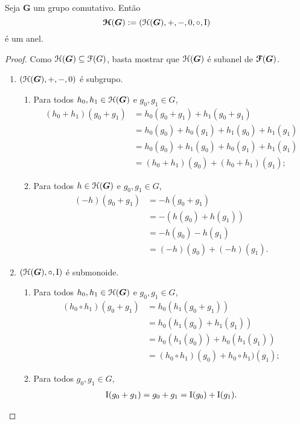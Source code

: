 \begin{proposition}
Seja $\bm G$ um grupo comutativo. Então
	\begin{equation*}
	\bm{\mathcal{H}}(\bm G) := (\mathcal{H}(\bm G),+,-,0,\circ,\mathrm{I})
	\end{equation*}
é um anel.
\end{proposition}
\begin{proof}
Como $\mathcal{H}(\bm G) \subseteq \mathcal{F}(G)$, basta mostrar que $\mathcal{H}(\bm G)$ é subanel de $\bm{\mathcal{F}}(\bm G)$.
	\begin{enumerate}
	\item $(\mathcal{H}(\bm G),+,-,0)$ é subgrupo.
		\begin{enumerate}
		\item Para todos $h_0,h_1 \in \mathcal{H}(\bm G)$ e $g_0,g_1 \in G$,
			\begin{align*}
			(h_0+h_1)(g_0+g_1) &= h_0(g_0+g_1) + h_1(g_0+g_1) \\
				&= h_0(g_0) + h_0(g_1) + h_1(g_0) + h_1(g_1) \\
				&= h_0(g_0) + h_1(g_0) + h_0(g_1) + h_1(g_1) \\
				&= (h_0 + h_1)(g_0) + (h_0 + h_1)(g_1);
			\end{align*}
		\item Para todos $h \in \mathcal{H}(\bm G)$ e $g_0,g_1 \in G$,
			\begin{align*}
			(-h)(g_0+g_1) &= -h(g_0+g_1) \\
				&= -(h(g_0)+h(g_1)) \\
				&= -h(g_0)-h(g_1) \\
				&= (-h)(g_0)+(-h)(g_1).
			\end{align*}
		\end{enumerate}
	\item $(\mathcal{H}(\bm G),\circ,\mathrm{I})$ é submonoide.
		\begin{enumerate}
		\item Para todos $h_0,h_1 \in \mathcal{H}(\bm G)$ e $g_0,g_1 \in G$,
			\begin{align*}
			(h_0 \circ h_1)(g_0+g_1) &= h_0(h_1(g_0+g_1)) \\
				&= h_0(h_1(g_0)+h_1(g_1)) \\
				&= h_0(h_1(g_0))+h_0(h_1(g_1)) \\
				&= (h_0 \circ h_1)(g_0)+h_0 \circ h_1)(g_1);
			\end{align*}
		\item Para todos $g_0,g_1 \in G$,
			\begin{align*}
			\mathrm{I}(g_0+g_1) = g_0+g_1 = \mathrm{I}(g_0)+\mathrm{I}(g_1).
			\qedhere
			\end{align*}
		\end{enumerate}
	\end{enumerate}
\end{proof}

